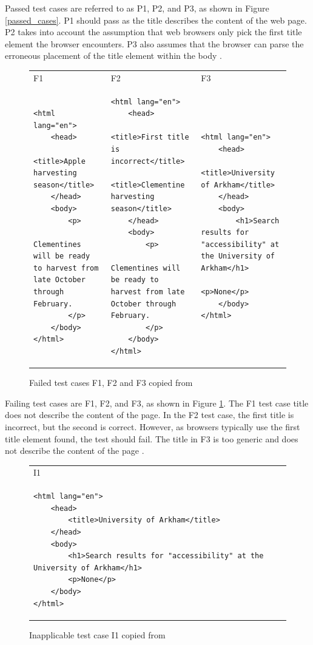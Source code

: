 Passed test cases are referred to as P1, P2, and P3, as shown in Figure \ref{passed_cases}. P1 should pass as the title describes the content of the web page. P2 takes into account the assumption that web browsers only pick the first title element the browser encounters. P3 also assumes that the browser can parse the erroneous placement of the title element within the body \citep{act_rule_g88}.


\begin{figure}[htbp]
\caption{Failed test cases F1, F2 and F3 copied from \textcite{act_rule_g88}}
\label{failing_cases}
\begin{tabular}{|p{4.9cm}|p{4.9cm}|p{4.9cm}|}
F1 & F2 & F3 \\
\begin{lstlisting}
<html lang="en">
	<head>
		<title>Apple harvesting season</title>
	</head>
	<body>
		<p>
			Clementines will be ready to harvest from late October through February.
		</p>
	</body>
</html>
\end{lstlisting}&
\begin{lstlisting}
<html lang="en">
	<head>
		<title>First title is incorrect</title>
		<title>Clementine harvesting season</title>
	</head>
	<body>
		<p>
			Clementines will be ready to harvest from late October through February.
		</p>
	</body>
</html>
\end{lstlisting}&
\begin{lstlisting}
<html lang="en">
	<head>
		<title>University of Arkham</title>
	</head>
	<body>
		<h1>Search results for "accessibility" at the University of Arkham</h1>
		<p>None</p>
	</body>
</html>
\end{lstlisting}
\end{tabular}
\end{figure}

Failing test cases are F1, F2, and F3, as shown in Figure \ref{failing_cases}. The F1 test case title does not describe the content of the page. In the F2 test case, the first title is incorrect, but the second is correct. However, as browsers typically use the first title element found, the test should fail. The title in F3 is too generic and does not describe the content of the page \citep{act_rule_g88}.

\begin{figure}
\caption{Inapplicable test case I1 copied from \textcite{act_rule_g88}}
\label{inapplicable_case}
\begin{tabular}{|p{4.9cm}|}
 I1 \\
 \begin{lstlisting}
<html lang="en">
	<head>
		<title>University of Arkham</title>
	</head>
	<body>
		<h1>Search results for "accessibility" at the University of Arkham</h1>
		<p>None</p>
	</body>
</html>
\end{lstlisting}
\end{tabular}
\end{figure}

